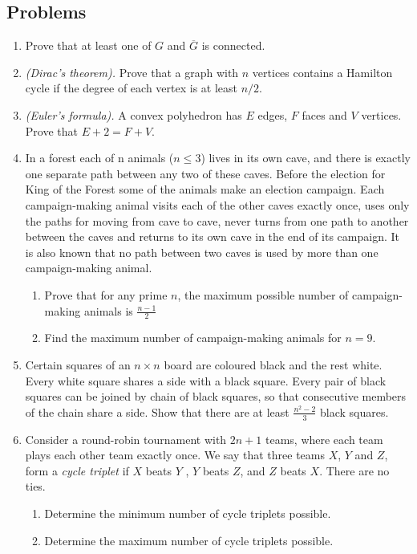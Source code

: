 \documentclass{article}
\begin{document}
\subsection*{Problems}
\begin{enumerate}
	\item
	Prove that at least one of $G$ and $\overline{G}$ is connected.
	
	\item 
	\emph{(Dirac's theorem).} Prove that a graph with $n$ vertices contains a Hamilton cycle if the degree of each vertex is at least $n/2$. 	
	
	\item 
	\emph{(Euler's formula).}  A convex polyhedron has $E$ edges, $F$ faces and $V$ vertices. Prove that $E+2=F+V$.

	\item %
	In a forest each of n animals ($n \leq 3$) lives in its own cave, and there is exactly one separate path
	between any two of these caves. Before the election for King of the Forest some of the animals
	make an election campaign. Each campaign-making animal visits each of the other caves exactly
	once, uses only the paths for moving from cave to cave, never turns from one path to another
	between the caves and returns to its own cave in the end of its campaign. It is also known that
	no path between two caves is used by more than one campaign-making animal.
	\begin{enumerate}
		\item
		Prove that for any prime $n$, the maximum possible number of campaign-making animals is $\tfrac{n-1}{2}$
		\item 
		Find the maximum number of campaign-making animals for $n = 9$.	
	\end{enumerate}
	
	\item %
	Certain squares of an $n \times n$ board are coloured black and the rest white. Every white square shares a side with a black square. Every pair of black squares can be joined by chain of black squares, so that consecutive members of the chain share a side. Show that there are at least $\tfrac{n^2-2}{3}$ black squares.
	
	
	\item %
	Consider a round-robin tournament with $2n + 1$ teams, where each team plays each other team exactly once. We say
	that three teams $X$, $Y$ and $Z$, form a \emph{cycle triplet} if $X$ beats $Y$ , $Y$ beats $Z$, and $Z$ beats $X$. There are no ties.
	\begin{enumerate}
		\item 
		Determine the minimum number of cycle triplets possible.
		\item 
		Determine the maximum number of cycle triplets possible.
	\end{enumerate}
	 

\end{enumerate}
\end{document}
